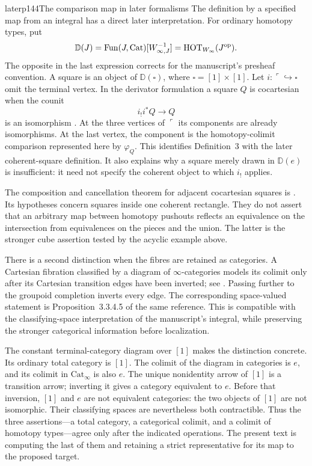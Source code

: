 \begin{enumerate}
\begin{dcomment}{later}{p144}{The comparison map in later formalisms}
The definition by a specified map from an integral has a direct later interpretation. For ordinary homotopy types, put
\[
 \mathbb D(J)=\operatorname{Fun}(J,\mathrm{Cat})[W_{\infty,J}^{-1}]
             =\mathrm{HOT}_{W_\infty}(J^{\mathrm{op}}).
\]
The opposite in the last expression corrects for the manuscript's presheaf convention. A square is an object of $\mathbb D(\square)$, where $\square=[1]\times[1]$. Let $i:\ulcorner\hookrightarrow\square$ omit the terminal vertex. In the derivator formulation a square $Q$ is cocartesian when the counit
\[
                   i_!i^*Q\longrightarrow Q
\]
is an isomorphism \citep[Definition~3.9]{Groth2013}. At the three vertices of $\ulcorner$ its components are already isomorphisms. At the last vertex, the component is the homotopy-colimit comparison represented here by $\varphi_Q$. This identifies Definition~3 with the later coherent-square definition. It also explains why a square merely drawn in $\mathbb D(e)$ is insufficient: it need not specify the coherent object to which $i_!$ applies.

The composition and cancellation theorem for adjacent cocartesian squares is \citet[Proposition~3.13]{Groth2013}. Its hypotheses concern squares inside one coherent rectangle. They do not assert that an arbitrary map between homotopy pushouts reflects an equivalence on the intersection from equivalences on the pieces and the union. The latter is the stronger cube assertion tested by the acyclic example above.

There is a second distinction when the fibres are retained as categories. A Cartesian fibration classified by a diagram of $\infty$-categories models its colimit only after its Cartesian transition edges have been inverted; see \citet[Corollary~3.3.4.3 and Warning~3.3.4.4]{Lurie2009HTT}. Passing further to the groupoid completion inverts every edge. The corresponding space-valued statement is Proposition~3.3.4.5 of the same reference. This is compatible with the classifying-space interpretation of the manuscript's integral, while preserving the stronger categorical information before localization.

The constant terminal-category diagram over $[1]$ makes the distinction concrete. Its ordinary total category is $[1]$. The colimit of the diagram in categories is $e$, and its colimit in $\mathrm{Cat}_\infty$ is also $e$. The unique nonidentity arrow of $[1]$ is a transition arrow; inverting it gives a category equivalent to $e$. Before that inversion, $[1]$ and $e$ are not equivalent categories: the two objects of $[1]$ are not isomorphic. Their classifying spaces are nevertheless both contractible. Thus the three assertions---a total category, a categorical colimit, and a colimit of homotopy types---agree only after the indicated operations. The present text is computing the last of them and retaining a strict representative for its map to the proposed target.
\end{dcomment}



\end{enumerate}
